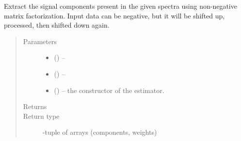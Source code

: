 \documentclass[letterpaper,10pt,english]{sphinxmanual}
\begin{document}
\begin{fulllineitems}
\label{\detokenize{xanespy:xanespy.xanes_math.extract_signals_nmf}}
Extract the signal components present in the given spectra using
non-negative matrix factorization. Input data can be negative, but
it will be shifted up, processed, then shifted down again.
\begin{quote}\begin{description}
\item[{Parameters}] \leavevmode\begin{itemize}
\item {} 
 (\sphinxstyleliteralemphasis{-}) -- 

\item {} 
 (\sphinxstyleliteralemphasis{-}) -- 

\item {} 
 (\sphinxstyleliteralemphasis{-}) -- the constructor of the estimator.

\end{itemize}

\item[{Returns}] \leavevmode


\item[{Return type}] -tuple of arrays (components, weights)

\end{description}\end{quote}

\end{fulllineitems}

\end{document}
